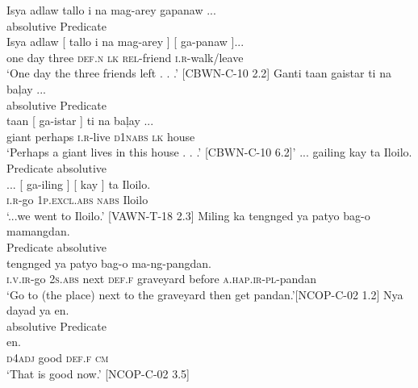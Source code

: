 \ea
\label{bkm:Ref116980651}
Isya  adlaw tallo  i  na  mag-arey gapanaw ...\\\smallskip
\hspace{2cm}absolutive\hspace{2.8cm}          Predicate \\
\gll Isya  adlaw [ tallo  i  na  mag-arey ] [ ga-panaw ]... \\
one  day {} three  \textsc{def.n}  \textsc{lk}  \textsc{rel}-friend {} {} \textsc{i.r}-walk/leave {} \\
\glt ‘One day the three friends left . . .’ [CBWN-C-10 2.2]
\z
\ea
\label{bkm:Ref116980654}
Ganti taan gaistar ti  na  baļay ...\\\smallskip
absolutive \hspace{1cm}   Predicate \\
\gll [ Ganti ] taan [ ga-istar ] ti  na  baļay ... \\
{} giant {} perhaps {} \textsc{i.r}-live {} \textsc{d1nabs}  \textsc{lk}  house \\
\glt ‘Perhaps a giant lives in this house . . .’ [CBWN-C-10 6.2]’
\z
\ea
\label{bkm:Ref116980701}
... gailing kay ta  Iloilo.\\\smallskip
\hspace{.3cm} Predicate \hspace{.3cm}  absolutive \\
\gll ... [ ga-iling ] [ kay ] ta  Iloilo. \\
  {} {} \textsc{i.r}-go {} {} 1\textsc{p.excl.abs} {} \textsc{nabs}  Iloilo \\
\glt ‘...we went to Iloilo.’ [VAWN-T-18 2.3]
\z
\ea
\label{bkm:Ref116980703}
Miling ka tengnged  ya  patyo bag-o  mamangdan.\\\smallskip
Predicate\hspace{.3cm} absolutive \\
\gll [ M-iling ] [ ka ] tengnged  ya  patyo bag-o  ma-ng-pangdan. \\
{} \textsc{i.v.ir}-go {} {} 2\textsc{s.abs}  {} next  \textsc{def.f}  graveyard before  \textsc{a.hap.ir-pl}-pandan \\
\glt ‘Go to (the place) next to the graveyard then get pandan.’[NCOP-C-02 1.2]
\z
\ea
\label{bkm:Ref116980658}
Nya dayad  ya  en.\\\smallskip
absolutive  Predicate \\
\gll [ Nya ]  [ dayad  ya  ] en. \\
{} \textsc{d4adj} {} {} good \textsc{def.f}  {} \textsc{cm} \\
\glt `That is good now.’ [NCOP-C-02 3.5]
\z

